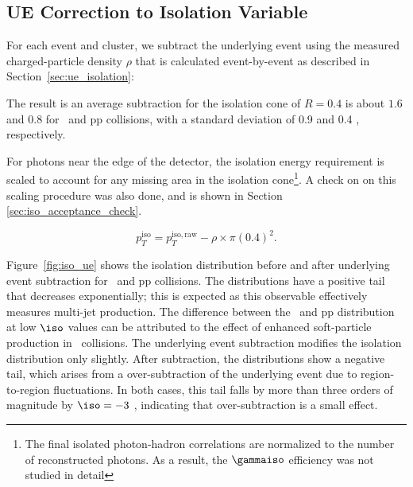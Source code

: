 \subsection{UE Correction to Isolation Variable}
\label{sec:ue_correction_isolation}
For each event and cluster, we subtract the underlying event using the measured charged-particle density $\rho$ that is calculated event-by-event as described in Section~\ref{sec:ue_isolation}:


The result is an average subtraction for the isolation cone of {$R=0.4$} is about {$1.6$ \GeVc} and {$0.8$ \GeVc} for \pPb~and pp collisions, with a standard deviation of {0.9 \GeVc} and {0.4 \GeVc}, respectively.  

 
For photons near the edge of the detector, the isolation energy requirement is scaled to account for any missing area in the isolation cone\footnote{The final isolated photon-hadron correlations are normalized to the number of reconstructed photons. As a result, the $\gammaiso$ efficiency was not studied in detail}. A check on on this scaling procedure was also done, and is shown in Section \ref{sec:iso_acceptance_check}. 

\begin{equation}
p_T^\mathrm{iso} = p_T^\mathrm{iso,raw} - \rho\times\pi(0.4)^{2}.
\end{equation}

Figure~\ref{fig:iso_ue} shows the isolation distribution before and after underlying event subtraction for \pPb~and pp collisions. The distributions have a positive tail that decreases exponentially; this is expected as this observable effectively measures multi-jet production. The difference between the \pPb~and pp distribution at low $\iso$ values can be attributed to the effect of enhanced soft-particle production in \pPb~collisions. The underlying event subtraction modifies the isolation distribution only slightly. After subtraction, the distributions show a negative tail, which arises from a over-subtraction of the underlying event due to region-to-region fluctuations. In both cases, this tail falls by more than three orders of magnitude by $\iso=-3$ \GeVc, indicating that over-subtraction is a small effect.   

